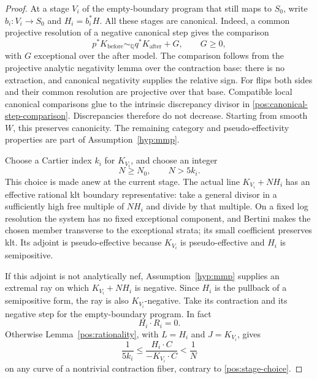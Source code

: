 \documentclass[11pt,letterpaper]{article}
\newcommand{\Q}{\mathbb{Q}}
\theoremstyle{definition}
\theoremstyle{remark}
\begin{document}
\begin{proof}
At a stage \(V_i\) of the empty-boundary program that still maps to
\(S_0\), write \(b_i:V_i\to S_0\) and \(H_i=b_i^*H\).
All these stages are canonical. Indeed, a common projective resolution
of a negative canonical step gives the comparison
\begin{equation}\label{pos:canonical-step-comparison}
 p^*K_{\mathrm{before}}\sim_{\Q}q^*K_{\mathrm{after}}+G,
 \qquad G\geq0,
\end{equation}
with \(G\) exceptional over the after model. The comparison follows
from the projective analytic negativity lemma over the contraction
base: there is no extraction, and canonical negativity supplies the
relative sign. For flips both sides and their common resolution are
projective over that base. Compatible local canonical comparisons
glue to the intrinsic discrepancy divisor in
\eqref{pos:canonical-step-comparison}. Discrepancies therefore do not
decrease. Starting from smooth \(W\), this preserves canonicity. The
remaining category and pseudo-effectivity properties are part of
Assumption~\ref{hyp:mmp}.

Choose a Cartier index \(k_i\) for \(K_{V_i}\), and choose an integer
\begin{equation}\label{pos:stage-choice}
 N\geq N_0,\qquad N>5k_i.
\end{equation}
This choice is made anew at the current stage. The actual line
\(K_{V_i}+NH_i\) has an effective rational klt boundary representative:
take a general divisor in a sufficiently high free multiple of
\(NH_i\) and divide by that multiple. On a fixed log resolution the
system has no fixed exceptional component, and Bertini makes the
chosen member transverse to the exceptional strata; its small
coefficient preserves klt. Its adjoint is pseudo-effective because
\(K_{V_i}\) is pseudo-effective and \(H_i\) is semipositive.

If this adjoint is not analytically nef, Assumption~\ref{hyp:mmp}
supplies an extremal ray on which \(K_{V_i}+NH_i\) is negative.
Since \(H_i\) is the pullback of a semipositive form, the ray is also
\(K_{V_i}\)-negative. Take its contraction and its negative step for
the empty-boundary program. In fact
\begin{equation}\label{pos:base-line-zero-on-ray}
 H_i\cdot R_i=0.
\end{equation}
Otherwise Lemma~\ref{pos:rationality}, with \(L=H_i\) and
\(J=K_{V_i}\), gives
\[
 \frac{1}{5k_i}
 \leq\frac{H_i\cdot C}{-K_{V_i}\cdot C}
 <\frac1N
\]
on any curve of a nontrivial contraction fiber, contrary to
\eqref{pos:stage-choice}.


\end{proof}
\end{document}
